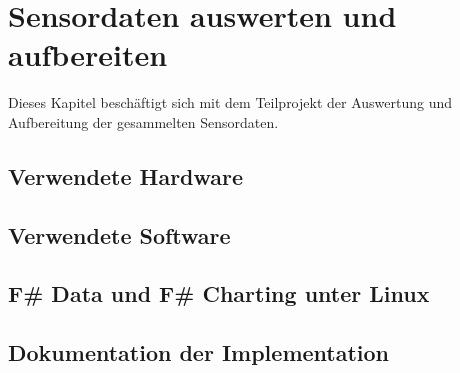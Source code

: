 
\chapter{Sensordaten auswerten und aufbereiten}
Dieses Kapitel beschäftigt sich mit dem Teilprojekt der Auswertung und Aufbereitung der gesammelten Sensordaten.


\section{Verwendete Hardware}


\section{Verwendete Software}


\section{F\# Data und F\# Charting unter Linux}

\section{Dokumentation der Implementation}